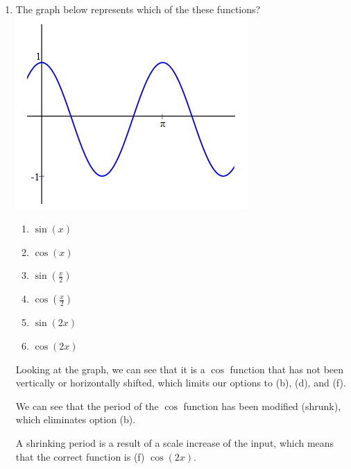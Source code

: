 \documentclass{article}
\begin{document}
\begin{enumerate}
\item The graph below represents which of the these functions?
\\\includegraphics[scale = 1]{Images/Trig3.png}

    \begin{enumerate}
        \item $\sin(x)$
        \item $\cos(x)$
        \item $\sin\left(\frac{x}{2}\right)$
        \item $\cos\left(\frac{x}{2}\right)$
        \item $\sin(2x)$
        \item $\cos(2x)$
    \end{enumerate}

Looking at the graph, we can see that it is a $\cos$ function that has not been vertically
or horizontally shifted, which limits our options to (b), (d), and (f).

We can see that the period of the $\cos$ function has been modified (shrunk), which eliminates
option (b).

A shrinking period is a result of a scale increase of the input, which means that the correct
function is (f) $\cos(2x)$.
\end{enumerate}

\pagebreak
\end{document}
